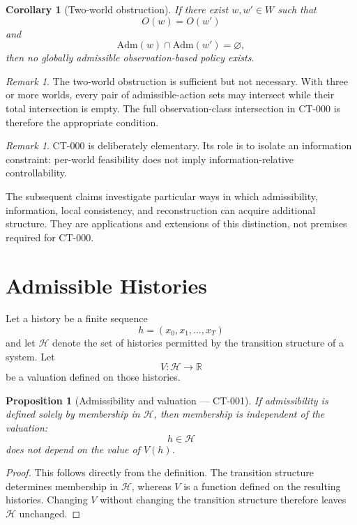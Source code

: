 \documentclass[11pt]{article}
\newtheorem{corollary}[theorem]{Corollary}
\newtheorem{proposition}[theorem]{Proposition}
\theoremstyle{definition}
\theoremstyle{remark}
\newtheorem{remark}[theorem]{Remark}
\newcommand{\histories}{\mathcal{H}}
\newcommand{\valuation}{V}
\newcommand{\worlds}{W}
\newcommand{\admissible}{\mathrm{Adm}}
\begin{document}
\begin{corollary}[Two-world obstruction]
If there exist $w,w'\in\worlds$ such that
\[
  O(w)=O(w')
\]
and
\[
  \admissible(w)\cap\admissible(w')
  =
  \varnothing,
\]
then no globally admissible observation-based policy exists.
\end{corollary}

\begin{remark}
The two-world obstruction is sufficient but not necessary. With three or more
worlds, every pair of admissible-action sets may intersect while their total
intersection is empty. The full observation-class intersection in CT-000 is
therefore the appropriate condition.
\end{remark}

\begin{remark}
CT-000 is deliberately elementary. Its role is to isolate an information
constraint: per-world feasibility does not imply information-relative
controllability.

The subsequent claims investigate particular ways in which admissibility,
information, local consistency, and reconstruction can acquire additional
structure. They are applications and extensions of this distinction, not
premises required for CT-000.
\end{remark}

\section{Admissible Histories}

Let a history be a finite sequence
\[
  h=(x_0,x_1,\ldots,x_T)
\]
and let $\histories$ denote the set of histories permitted by the transition
structure of a system. Let
\[
  \valuation:\histories\to\mathbb{R}
\]
be a valuation defined on those histories.

\begin{proposition}[Admissibility and valuation --- CT-001]
If admissibility is defined solely by membership in $\histories$, then
membership is independent of the valuation:
\[
  h\in\histories
\]
does not depend on the value of $\valuation(h)$.
\end{proposition}

\begin{proof}
This follows directly from the definition. The transition structure determines
membership in $\histories$, whereas $\valuation$ is a function defined on the
resulting histories. Changing $\valuation$ without changing the transition
structure therefore leaves $\histories$ unchanged.
\end{proof}
\end{document}
